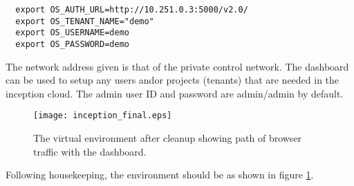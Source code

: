\small\begin{verbatim}
  export OS_AUTH_URL=http://10.251.0.3:5000/v2.0/
  export OS_TENANT_NAME="demo"
  export OS_USERNAME=demo
  export OS_PASSWORD=demo
\end{verbatim}\normalsize

The network address given is that of the private control network. 
The dashboard can be used to setup any users and\/or projects (tenants) that are needed in the inception cloud. 
The admin user ID and password are admin/admin by default. 

\begin{figure}
  \centering
  \texttt{[image: inception\_final.eps]}
  \caption{
	\small The virtual environment after cleanup showing path of browser traffic with the dashboard.
  	\label{fg_final}\normalsize
  }
  \normalsize
\end{figure}
Following housekeeping, the environment should be as shown in figure \ref{fg_final}.
